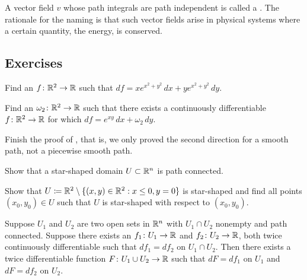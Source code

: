 A vector field $v$ whose path integrals are path independent is called
a \emph{}.  The rationale for the naming
is that such vector fields arise in physical systems
where a certain quantity, the energy, is conserved.

\subsection{Exercises}

\begin{exercise}
Find an $f \colon {\mathbb{R}}^2 \to {\mathbb{R}}$ such that $df = xe^{x^2+y^2}\, dx +
ye^{x^2+y^2} \, dy$.
\end{exercise}

\begin{exercise}
Find an $\omega_2 \colon {\mathbb{R}}^2 \to {\mathbb{R}}$ such that
there exists a continuously differentiable $f \colon {\mathbb{R}}^2 \to {\mathbb{R}}$
for which
$df = e^{xy} \,dx + \omega_2 \,dy$.
\end{exercise}

\begin{exercise}
Finish the proof of , that is, we only proved the
second direction for a smooth path, not a piecewise smooth path.
\end{exercise}

\begin{exercise}
Show that a star-shaped domain $U \subset {\mathbb{R}}^n$ is path connected.
\end{exercise}

\begin{exercise}
Show that $U \coloneqq {\mathbb{R}}^2 \setminus \{ (x,y) \in {\mathbb{R}}^2 : x \leq 0, y=0 \}$ is
star-shaped and find all points $(x_0,y_0) \in U$ such that
$U$ is star-shaped with respect to $(x_0,y_0)$.
\end{exercise}

\begin{exercise}
Suppose $U_1$ and $U_2$ are two open sets in ${\mathbb{R}}^n$ with $U_1 \cap U_2$
nonempty and path connected.
Suppose there exists an $f_1 \colon U_1 \to {\mathbb{R}}$ and
$f_2 \colon U_2 \to {\mathbb{R}}$, both twice continuously differentiable
such that $d f_1 = d f_2$ on $U_1 \cap U_2$.
Then there exists a twice differentiable function $F \colon U_1 \cup U_2 \to
{\mathbb{R}}$ such that $dF = df_1$ on $U_1$ and $dF = df_2$ on $U_2$.
\end{exercise}

